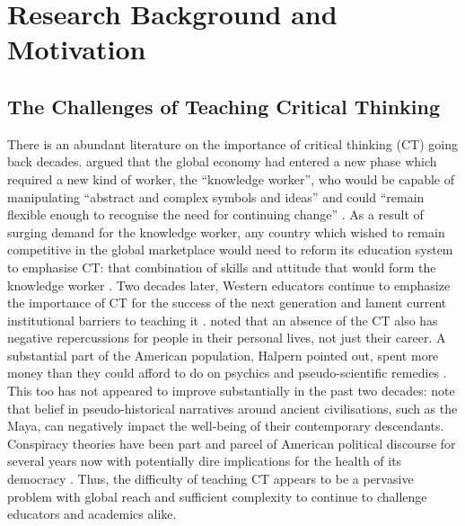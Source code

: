 \documentclass{l4proj}
\begin{document}
\chapter{Research Background and Motivation}

\section{The Challenges of Teaching Critical Thinking}

There is an abundant literature on the importance of critical thinking (CT) going back decades. \citet{hunt1995will} argued that the global economy had entered a new phase which required a new kind of worker, the “knowledge worker”, who would be capable of manipulating “abstract and complex symbols and ideas” and could “remain flexible enough to recognise the need for continuing change” \citep{hunt1995will}. As a result of surging demand for the knowledge worker, any country which wished to remain competitive in the global marketplace would need to reform its education system to emphasise CT: that combination of skills and attitude that would form the knowledge worker \citep{hunt1995will}. Two decades later, Western educators continue to emphasize the importance of CT for the success of the next generation and lament current institutional barriers to teaching it \citep{davies2016ct, Staton2021ct}. \citet{halpern1998teaching} noted that an absence of the CT also has negative repercussions for people in their personal lives, not just their career. A substantial part of the American population, Halpern pointed out, spent more money than they could afford to do on psychics and pseudo-scientific remedies \citep{halpern1998teaching}. This too has not appeared to improve substantially in the past two decades: \citet{mclaughlin2017explicitly} note that belief in pseudo-historical narratives around ancient civilisations, such as the Maya, can negatively impact the well-being of their contemporary descendants. Conspiracy theories have been part and parcel of American political discourse for several years now with potentially dire implications for the health of its democracy \citep{venka2020QAnon}. Thus, the difficulty of teaching CT appears to be a pervasive problem with global reach and sufficient complexity to continue to challenge educators and academics alike. 
\end{document}
